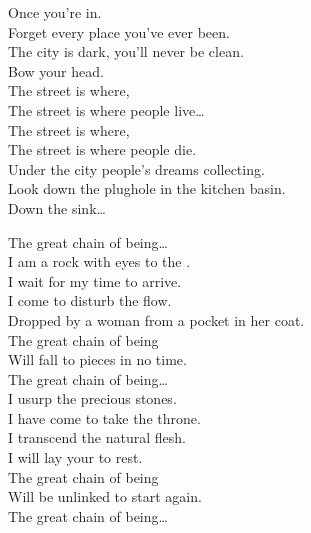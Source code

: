 Once you're in. \\
Forget every place you've ever been. \\
The city is dark, you'll never be clean. \\
Bow your head. \\

The street is where, \\
The street is where people live… \\
The street is where, \\
The street is where people die. \\

Under the city people's dreams collecting. \\
Look down the plughole in the kitchen basin. \\

Down the sink… \\





The great chain of being… \\

I am a rock with eyes to the . \\
I wait for my time to arrive. \\
I come to disturb the flow. \\
Dropped by a woman from a pocket in her coat. \\

The great chain of being \\
Will fall to pieces in no time. \\

The great chain of being… \\

I usurp the precious stones. \\
I have come to take the throne. \\
I transcend the natural flesh. \\
I will lay your  to rest. \\

The great chain of being \\
Will be unlinked to start again. \\

The great chain of being… \\

